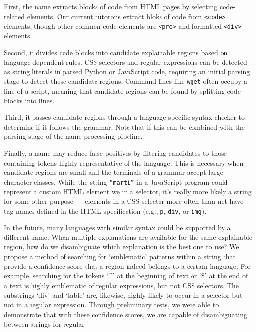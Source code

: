 First, the \gls{name} extracts blocks of code from HTML pages by selecting code-related elements.
Our current tutorons extract bloks of code from \texttt{<code>} elements, though other common code elements are \texttt{<pre>} and formatted \texttt{<div>} elements.

Second, it divides code blocks into candidate explainable regions based on language-dependent rules.
CSS selectors and regular expressions can be detected as string literals in parsed Python or JavaScript code, requiring an initial parsing stage to detect these candidate regions.
Command lines like \texttt{wget} often occupy a line of a script, meaning that candidate regions can be found by splitting code blocks into lines.

Third, it passes candidate regions through a language-specific syntax checker to determine if it follows the grammar.
Note that if this can be combined with the parsing stage of the \gls{name} processing pipeline.

Finally, a \gls{name} may reduce false positives by filtering candidates to those containing tokens highly representative of the language.
This is necessary when candidate regions are small and the terminals of a grammar accept large character classes.
While the string \texttt{``marti''} in a JavaScript program could represent a custom HTML element we in a selector, it's really more likely a string for some other purpose --- elements in a CSS selector more often than not have tag names defined in the HTML specification (e.g., \texttt{p}, \texttt{div}, or \texttt{img}).

\begin{changes}
In the future, many languages with similar syntax could be supported by a different \gls{name}.
When multiple explanations are available for the same explainable region, how do we disambiguate which explanation is the best one to use?
We propose a method of searching for `emblematic' patterns within a string that provide a confidence score that a region indeed belongs to a certain language.
For example, searching for the tokens `\textasciicircum' at the beginning of text or `\$' at the end of a text is highly emblematic of regular expressions, but not CSS selectors.
The substrings `div' and `table' are, likewise, highly likely to occur in a selector but not in a regular expression.
Through preliminary tests, we were able to demonstrate that with these confidence scores, we are capable of disambiguating between strings for regular 
\end{changes}

